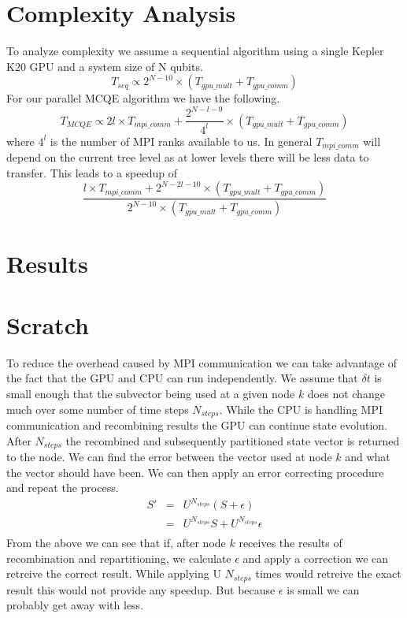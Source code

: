 \documentclass{article}
\newcommand{\beq}{\begin{equation}}
\newcommand{\eneq}{\end{equation}}
\newcommand{\beqy}{\begin{eqnarray}}
\newcommand{\eneqy}{\end{eqnarray}}
\newcommand{\bseq}{\begin{subequations}}
\newcommand{\enseq}{\end{subequations}}
\begin{document}
\section{Complexity Analysis}
To analyze complexity we assume a sequential algorithm using a single Kepler K20 GPU and a system size of N qubits.
\beq
T_{seq}  \propto  2^{N-10}\times(T_{gpu\_mult} +  T_{gpu\_comm})
\eneq
For our parallel MCQE algorithm we have the following.
\beq
T_{MCQE} \propto 2l\times T_{mpi\_comm} + \frac{2^{N-l-9}}{4^{l}}\times(T_{gpu\_mult} + T_{gpu\_comm})
\eneq
where $4^{l}$ is the number of MPI ranks available to us.  In general $T_{mpi\_comm}$ will depend on the current tree level as at lower levels there will be less data to transfer.  This leads to a speedup of 
\beq
\frac{l\times T_{mpi\_comm} + 2^{N-2l-10}\times(T_{gpu\_mult} + T_{gpu\_comm})}{2^{N-10}\times(T_{gpu\_mult} +  T_{gpu\_comm})}
\eneq

\section{Results}
\section{Scratch}
To reduce the overhead caused by MPI communication we can take advantage of the fact that the GPU and CPU can run independently.  We assume that $\delta t$ is small enough that the subvector being used at a given node $k$ does not change much over some number of time steps $N_{steps}$.  While the CPU is handling MPI communication and recombining results the GPU can continue state evolution.  After $N_{steps}$ the recombined and subsequently partitioned state vector is returned to the node.  We can find the error between the vector used at node $k$ and what the vector should have been.  We can then apply an error correcting procedure and repeat the process.
\bseq
\beqy
S' 	&=& U^{N_{steps}}(S+\epsilon)\\
	&=& U^{N_{steps}}S + U^{N_{steps}}\epsilon\\
\eneqy
\enseq
From the above we can see that if, after node $k$ receives the results of recombination and repartitioning, we calculate $\epsilon$ and apply a correction we can retreive the correct result.  While applying U $N_{steps}$ times would retreive the exact result this would not provide any speedup.  But because $\epsilon$ is small we can probably get away with less.
\end{document}
